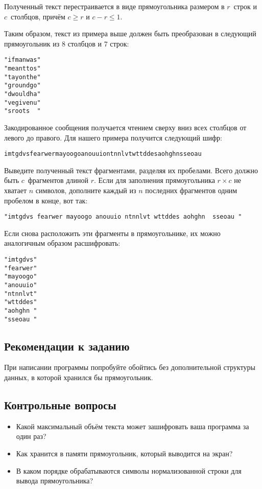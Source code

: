 \documentclass[10pt,twoside,openany]{book}
\begin{document}
Полученный текст перестраивается в виде прямоугольника размером в $r$~строк и $c$~столбцов,
причём $c \geq r$ и $c - r \leq 1$.

Таким образом, текст из примера выше должен быть преобразован в следующий прямоугольник
из $8$ столбцов и $7$ строк:

\begin{verbatim}
"ifmanwas"
"meanttos"
"tayonthe"
"groundgo"
"dwouldha"
"vegivenu"
"sroots  "
\end{verbatim}

Закодированное сообщения получается чтением сверху вниз всех столбцов от левого до правого.
Для нашего примера получится следующий шифр:

\begin{verbatim}
imtgdvsfearwermayoogoanouuiontnnlvtwttddesaohghnsseoau
\end{verbatim}

Выведите полученный текст фрагментами, разделяя их пробелами.
Всего должно быть $c$~фрагментов длиной $r$.
Если для заполнения прямоугольника $r\times c$ не хватает $n$ символов,
дополните каждый из $n$ последних фрагментов одним пробелом в конце, вот так:

\begin{verbatim}
"imtgdvs fearwer mayoogo anouuio ntnnlvt wttddes aohghn  sseoau "
\end{verbatim}

Если снова расположить эти фрагменты в прямоугольнике, их можно аналогичным образом расшифровать:

\begin{verbatim}
"imtgdvs"
"fearwer"
"mayoogo"
"anouuio"
"ntnnlvt"
"wttddes"
"aohghn "
"sseoau "
\end{verbatim}

\subsection*{Рекомендации к заданию}

При написании программы попробуйте обойтись без дополнительной структуры данных, в которой
хранился бы прямоугольник.

\subsection*{Контрольные вопросы}

\begin{itemize}
    \item Какой максимальный объём текста может зашифровать ваша программа за один раз?
    \item Как хранится в памяти прямоугольник, который выводится на экран?
    \item В каком порядке обрабатываются символы нормализованной строки для вывода прямоугольника?
\end{itemize}
\end{document}

